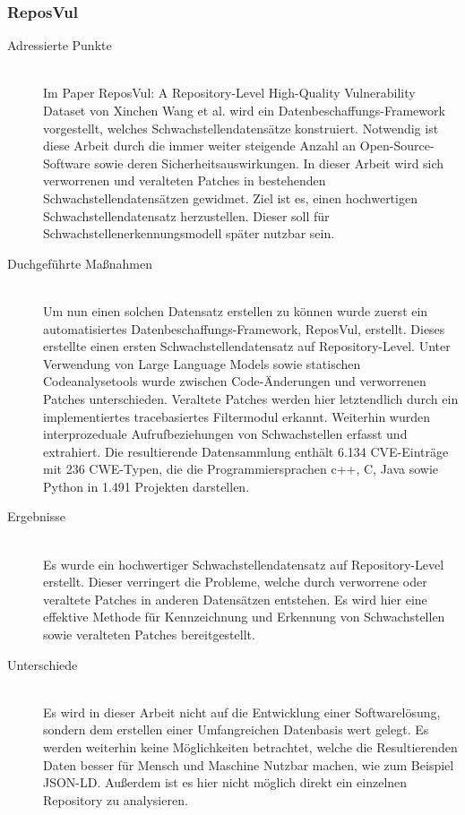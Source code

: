 \subsubsection{ReposVul} \label{sec:ReposVul}
    \begin{description}
        \item[Adressierte Punkte]\hfill \\
            Im Paper \glqq ReposVul: A Repository-Level High-Quality Vulnerability Dataset\grqq\cite{article:wang2024reposvul} von Xinchen Wang et al. wird ein Datenbeschaffungs-Framework vorgestellt, welches Schwachstellendatensätze konstruiert.
            Notwendig ist diese Arbeit durch die immer weiter steigende Anzahl an Open-Source-Software sowie deren Sicherheitsauswirkungen.
            In dieser Arbeit wird sich verworrenen und veralteten Patches in bestehenden Schwachstellendatensätzen gewidmet.
            Ziel ist es, einen hochwertigen Schwachstellendatensatz herzustellen.
            Dieser soll für Schwachstellenerkennungsmodell später nutzbar sein.
        \item[Duchgeführte Maßnahmen]\hfill \\
            Um nun einen solchen Datensatz erstellen zu können wurde zuerst ein automatisiertes Datenbeschaffungs-Framework, \glqq ReposVul\grqq, erstellt.
            Dieses erstellte einen ersten Schwachstellendatensatz auf Repository-Level.
            Unter Verwendung von Large Language Models sowie statischen Codeanalysetools wurde zwischen Code-Änderungen und verworrenen Patches unterschieden.
            Veraltete Patches werden hier letztendlich durch ein implementiertes tracebasiertes Filtermodul erkannt.
            Weiterhin wurden interprozeduale Aufrufbeziehungen von Schwachstellen erfasst und extrahiert.
            Die resultierende Datensammlung enthält 6.134 CVE-Einträge mit 236 CWE-Typen, die die Programmiersprachen c++, C, Java sowie Python in 1.491 Projekten darstellen.
        \item[Ergebnisse]\hfill \\
            Es wurde ein hochwertiger Schwachstellendatensatz auf Repository-Level erstellt.
            Dieser verringert die Probleme, welche durch verworrene oder veraltete Patches in anderen Datensätzen entstehen.
            Es wird hier eine effektive Methode für Kennzeichnung und Erkennung von Schwachstellen sowie veralteten Patches bereitgestellt.
        \item[Unterschiede]\hfill \\
            Es wird in dieser Arbeit nicht auf die Entwicklung einer Softwarelösung, sondern dem erstellen einer Umfangreichen Datenbasis wert gelegt.
            Es werden weiterhin keine Möglichkeiten betrachtet, welche die Resultierenden Daten besser für Mensch und Maschine Nutzbar machen, wie zum Beispiel \ac{JSON-LD}.
            Außerdem ist es hier nicht möglich direkt ein einzelnen Repository zu analysieren.
    \end{description}